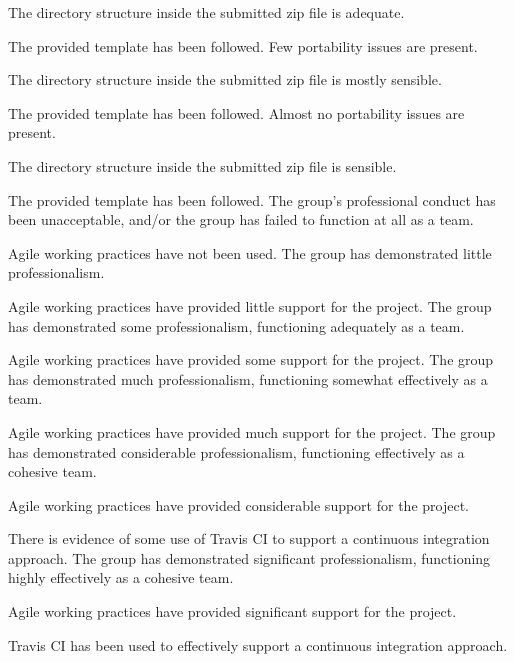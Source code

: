 \documentclass{../../fal_assignment}
\begin{document}
\begin{markingrubric}
            \par The directory structure inside the submitted zip file is adequate.
            \par The provided template has been followed.
        \grade Few portability issues are present.
            \par The directory structure inside the submitted zip file is mostly sensible.
            \par The provided template has been followed.
        \grade Almost no portability issues are present.
            \par The directory structure inside the submitted zip file is sensible.
            \par The provided template has been followed.
%
        \grade\fail The group's professional conduct has been unacceptable,
            and/or the group has failed to function at all as a team.
            \par Agile working practices have not been used.
        \grade The group has demonstrated little professionalism.
            \par Agile working practices have provided little support for the project.
        \grade The group has demonstrated some professionalism,
            functioning adequately as a team.
            \par Agile working practices have provided some support for the project.
        \grade The group has demonstrated much professionalism,
            functioning somewhat effectively as a team.
            \par Agile working practices have provided much support for the project.
        \grade The group has demonstrated considerable professionalism,
            functioning effectively as a cohesive team.
            \par Agile working practices have provided considerable support for the project.
            \par There is evidence of some use of Travis CI to support a continuous integration approach.
        \grade The group has demonstrated significant professionalism,
            functioning highly effectively as a cohesive team.
            \par Agile working practices have provided significant support for the project.
            \par Travis CI has been used to effectively support a continuous integration approach.
%

\end{markingrubric}
\end{document}
